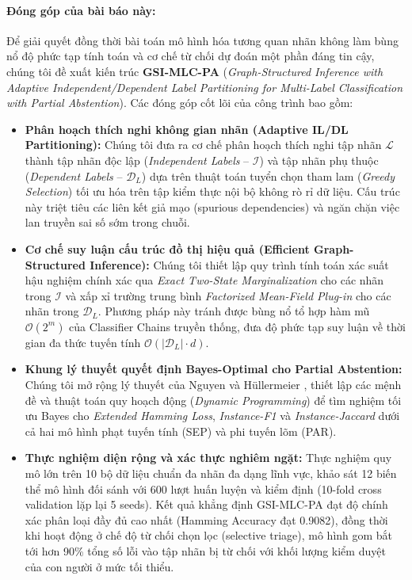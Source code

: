 \documentclass[11pt,a4paper]{article}
\begin{document}
\paragraph{Đóng góp của bài báo này:} Để giải quyết đồng thời bài toán mô hình hóa tương quan nhãn không làm bùng nổ độ phức tạp tính toán và cơ chế từ chối dự đoán một phần đáng tin cậy, chúng tôi đề xuất kiến trúc \textbf{GSI-MLC-PA} (\textit{Graph-Structured Inference with Adaptive Independent/Dependent Label Partitioning for Multi-Label Classification with Partial Abstention}). Các đóng góp cốt lõi của công trình bao gồm:
\begin{itemize}
    \item \textbf{Phân hoạch thích nghi không gian nhãn (Adaptive IL/DL Partitioning):} Chúng tôi đưa ra cơ chế phân hoạch thích nghi tập nhãn $\mathcal{L}$ thành tập nhãn độc lập (\textit{Independent Labels} -- $\mathcal{I}$) và tập nhãn phụ thuộc (\textit{Dependent Labels} -- $\mathcal{D}_L$) dựa trên thuật toán tuyển chọn tham lam (\textit{Greedy Selection}) tối ưu hóa trên tập kiểm thực nội bộ không rò rỉ dữ liệu. Cấu trúc này triệt tiêu các liên kết giả mạo (spurious dependencies) và ngăn chặn việc lan truyền sai số sớm trong chuỗi.
    \item \textbf{Cơ chế suy luận cấu trúc đồ thị hiệu quả (Efficient Graph-Structured Inference):} Chúng tôi thiết lập quy trình tính toán xác suất hậu nghiệm chính xác qua \textit{Exact Two-State Marginalization} cho các nhãn trong $\mathcal{I}$ và xấp xỉ trường trung bình \textit{Factorized Mean-Field Plug-in} cho các nhãn trong $\mathcal{D}_L$. Phương pháp này tránh được bùng nổ tổ hợp hàm mũ $\mathcal{O}(2^m)$ của Classifier Chains truyền thống, đưa độ phức tạp suy luận về thời gian đa thức tuyến tính $\mathcal{O}(|\mathcal{D}_L| \cdot d)$.
    \item \textbf{Khung lý thuyết quyết định Bayes-Optimal cho Partial Abstention:} Chúng tôi mở rộng lý thuyết của Nguyen và H\"ullermeier \cite{nguyen2021multilabel}, thiết lập các mệnh đề và thuật toán quy hoạch động (\textit{Dynamic Programming}) để tìm nghiệm tối ưu Bayes cho \textit{Extended Hamming Loss}, \textit{Instance-F1} và \textit{Instance-Jaccard} dưới cả hai mô hình phạt tuyến tính (SEP) và phi tuyến lõm (PAR).
    \item \textbf{Thực nghiệm diện rộng và xác thực nghiêm ngặt:} Thực nghiệm quy mô lớn trên 10 bộ dữ liệu chuẩn đa nhãn đa dạng lĩnh vực, khảo sát 12 biến thể mô hình đối sánh với 600 lượt huấn luyện và kiểm định (10-fold cross validation lặp lại 5 seeds). Kết quả khẳng định GSI-MLC-PA đạt độ chính xác phân loại đầy đủ cao nhất (Hamming Accuracy đạt 0.9082), đồng thời khi hoạt động ở chế độ từ chối chọn lọc (selective triage), mô hình gom bắt tới hơn 90\% tổng số lỗi vào tập nhãn bị từ chối với khối lượng kiểm duyệt của con người ở mức tối thiểu.
\end{itemize}
\end{document}
